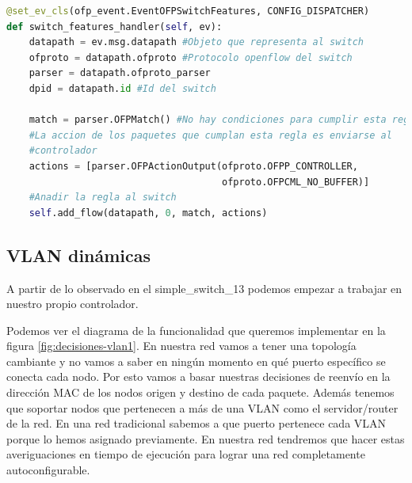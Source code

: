 \begin{lstlisting}[language=Python, label=lst:ryu-to-controller, caption={Instalación de la regla por defecto en un switch.}]
@set_ev_cls(ofp_event.EventOFPSwitchFeatures, CONFIG_DISPATCHER)
def switch_features_handler(self, ev):
    datapath = ev.msg.datapath #Objeto que representa al switch
    ofproto = datapath.ofproto #Protocolo openflow del switch
    parser = datapath.ofproto_parser
    dpid = datapath.id #Id del switch

    match = parser.OFPMatch() #No hay condiciones para cumplir esta regla
    #La accion de los paquetes que cumplan esta regla es enviarse al
    #controlador
    actions = [parser.OFPActionOutput(ofproto.OFPP_CONTROLLER,
                                      ofproto.OFPCML_NO_BUFFER)]
    #Anadir la regla al switch
    self.add_flow(datapath, 0, match, actions)
\end{lstlisting}



\subsection{VLAN dinámicas}

A partir de lo observado en el simple\_switch\_13 podemos empezar a trabajar en nuestro propio controlador. 

Podemos ver el diagrama de la funcionalidad que queremos implementar en la figura \ref{fig:decisiones-vlan1}. En nuestra red vamos a tener una topología cambiante y no vamos a saber en ningún momento en qué puerto específico se conecta cada nodo. Por esto vamos a basar nuestras decisiones de reenvío en la dirección MAC de los nodos origen y destino de cada paquete. Además tenemos que soportar nodos que pertenecen a más de una VLAN como el servidor/router de la red. En una red tradicional sabemos a que puerto pertenece cada VLAN porque lo hemos asignado previamente. En nuestra red tendremos que hacer estas averiguaciones en tiempo de ejecución para lograr una red completamente autoconfigurable.

